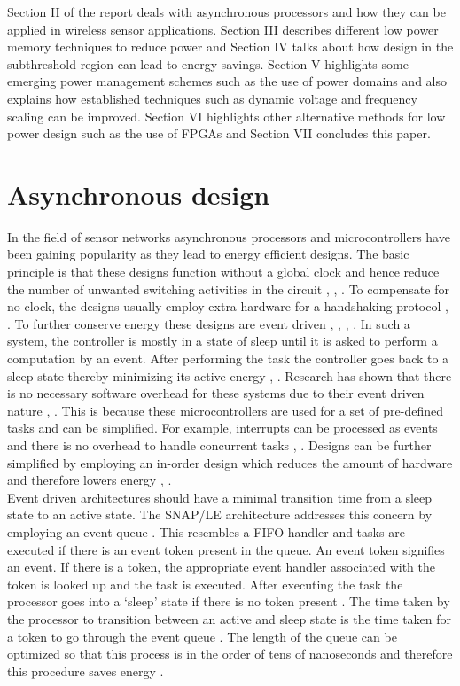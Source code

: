 \documentclass[journal]{IEEEtran}
\begin{document}
Section II of the report deals with asynchronous processors and how they can be applied in wireless sensor applications. Section III describes different low power memory techniques to reduce power and Section IV talks about how design in the subthreshold region can lead to energy savings. Section V highlights some emerging power management schemes such as the use of power domains and also explains how established techniques such as dynamic voltage and frequency scaling can be improved. Section VI highlights other alternative methods for low power design such as the use of FPGAs and Section VII concludes this paper.

\section{Asynchronous design}
In the field of sensor networks asynchronous processors and microcontrollers have been gaining popularity as they lead to energy efficient designs. The basic principle is that these designs function without a global clock and hence reduce the number of unwanted switching activities in the circuit \cite{SNAP/LE}, \cite{LowPower2005}, \cite{FPGAEvent}. To compensate for no clock, the designs usually employ extra hardware for a handshaking protocol \cite{SNAP/LE}, \cite{FPGAEvent}. To further conserve energy these designs are event driven \cite{SNAP/LE}, \cite{LowPower2005}, \cite{FPGAEvent}, \cite{AVR}. In such a system, the controller is mostly in a state of sleep until it is asked to perform a computation by an event. After performing the task the controller goes back to a sleep state thereby minimizing its active energy \cite{SNAP/LE}, \cite{LowPower2005}. Research has shown that there is no necessary software overhead for these systems due to their event driven nature \cite{SNAP/LE}, \cite{LowPower2005}. This is because these microcontrollers are used for a set of pre-defined tasks and can be simplified. For example, interrupts can be processed as events and there is no overhead to handle concurrent tasks \cite{SNAP/LE}, \cite{LowPower2005}. Designs can be further simplified by employing an in-order design which reduces the amount of hardware and therefore lowers energy \cite{LowPower2005}, \cite{SmartDust}. \\

Event driven architectures should have a minimal transition time from a sleep state to an active state. The SNAP/LE architecture addresses this concern by employing an event queue \cite{SNAP/LE}. This resembles a FIFO handler and tasks are executed if there is an event token present in the queue. An event token signifies an event. If there is a token, the appropriate event handler associated with the token is looked up and the task is executed. After executing the task the processor goes into a `sleep' state if there is no token present \cite{SNAP/LE}. The time taken by the processor to transition between an active and sleep state is the time taken for a token to go through the event queue \cite{SNAP/LE}. The length of the queue can be optimized so that this process is in the order of tens of nanoseconds and therefore this procedure saves energy \cite{SNAP/LE}. \\
\end{document}
